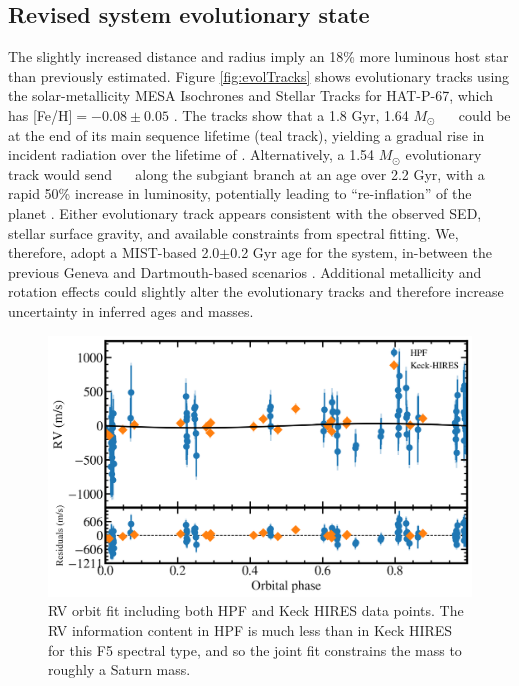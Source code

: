\documentclass[twocolumn]{aastex631}
\newcommand{\hatp}{\object{HAT-P-67}~}
\newcommand{\hatpb}{\object{HAT-P-67 b}}
\begin{document}
\subsection{Revised system evolutionary state}\label{secMISTtracks}
The slightly increased distance and radius imply an 18\% more luminous host star than previously estimated.  Figure \ref{fig:evolTracks} shows evolutionary tracks using the solar-metallicity MESA \citep{2011ApJS..192....3P,2013ApJS..208....4P,2015ApJS..220...15P} Isochrones and Stellar Tracks \citep[MIST;][]{2016ApJS..222....8D,2016ApJ...823..102C} for HAT-P-67, which has [Fe/H]$=-0.08\pm0.05$ \citep{2017AJ....153..211Z}.  The tracks show that a 1.8 Gyr, 1.64 $M_\odot$ \hatp~ could be at the end of its main sequence lifetime (teal track), yielding a gradual rise in incident radiation over the lifetime of \hatpb.  Alternatively, a 1.54 $M_\odot$ evolutionary track would send \hatp~ along the subgiant branch at an age over 2.2 Gyr, with a rapid 50\% increase in luminosity, potentially leading to ``re-inflation'' of the planet \citep{2021ApJ...909L..16T}.  Either evolutionary track appears consistent with the observed SED, stellar surface gravity, and available constraints from spectral fitting.  We, therefore, adopt a MIST-based 2.0$\pm$0.2 Gyr age for the system, in-between the previous Geneva and Dartmouth-based scenarios \citep{2017AJ....153..211Z}.  Additional metallicity and rotation effects could slightly alter the evolutionary tracks and therefore increase uncertainty in inferred ages and masses.


\begin{figure}
    \includegraphics[width=\linewidth]{figures/HAT-P-67b_rv.pdf}
    \caption{RV orbit fit including both HPF and Keck HIRES data points.  The RV information content in HPF is much less than in Keck HIRES for this F5 spectral type, and so the joint fit constrains the mass to roughly a Saturn mass.}
    \label{fig:RVfit}
\end{figure}
\end{document}
